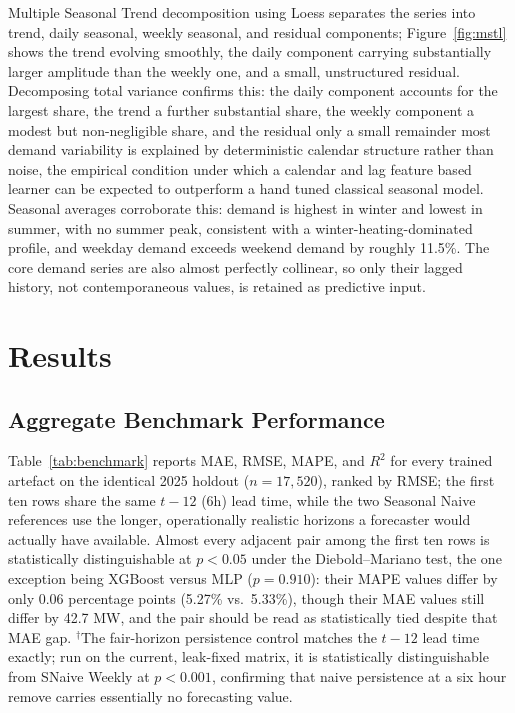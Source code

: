 \documentclass[runningheads]{llncs}
\begin{document}
Multiple Seasonal Trend decomposition using Loess \cite{bandara2021mstl} separates the series into trend, daily seasonal, weekly seasonal, and residual components; Figure~\ref{fig:mstl} shows the trend evolving smoothly, the daily component carrying substantially larger amplitude than the weekly one, and a small, unstructured residual. Decomposing total variance confirms this: the daily component accounts for the largest share, the trend a further substantial share, the weekly component a modest but non-negligible share, and the residual only a small remainder most demand variability is explained by deterministic calendar structure rather than noise, the empirical condition under which a calendar and lag feature based learner can be expected to outperform a hand tuned classical seasonal model. Seasonal averages corroborate this: demand is highest in winter and lowest in summer, with no summer peak, consistent with a winter-heating-dominated profile, and weekday demand exceeds weekend demand by roughly 11.5\%. The core demand series are also almost perfectly collinear, so only their lagged history, not contemporaneous values, is retained as predictive input.



\section{Results}
\label{sec:results}

\subsection{Aggregate Benchmark Performance}
\label{sec:evaluation}





Table~\ref{tab:benchmark} reports MAE, RMSE, MAPE, and $R^2$ for every trained artefact on the identical 2025 holdout ($n=17{,}520$), ranked by RMSE; the first ten rows share the same $t-12$ (6h) lead time, while the two Seasonal Naive references use the longer, operationally realistic horizons a forecaster would actually have available. Almost every adjacent pair among the first ten rows is statistically distinguishable at $p<0.05$ under the Diebold--Mariano test, the one exception being XGBoost versus MLP ($p=0.910$): their MAPE values differ by only 0.06 percentage points (5.27\% vs.\ 5.33\%), though their MAE values still differ by 42.7 MW, and the pair should be read as statistically tied despite that MAE gap. $^{\dagger}$The fair-horizon persistence control matches the $t-12$ lead time exactly; run on the current, leak-fixed matrix, it is statistically distinguishable from SNaive Weekly at $p<0.001$, confirming that naive persistence at a six hour remove carries essentially no forecasting value.
\end{document}
